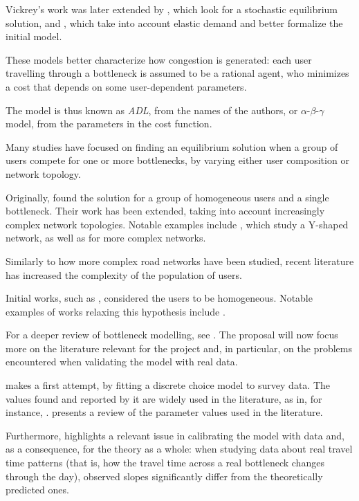 \documentclass{article}
\begin{document}
Vickrey's work was later extended by \textcite{de1983stochastic},
which look for a stochastic equilibrium solution,
and \textcite{d0907f84-e14a-3d98-ad20-759f41491d6e},
which take into account elastic demand and better formalize the initial model.

These models better characterize how congestion is generated:
each user travelling through a bottleneck is assumed to be a rational agent, 
who minimizes a cost that depends on some user-dependent parameters.

The model is thus known as \textit{ADL}, from the names of the authors,
or \(\alpha\)-\(\beta\)-\(\gamma\) model, from the parameters in the cost function.

Many studies have focused on finding an equilibrium solution when a group of users compete for one or more bottlenecks,
by varying either user composition or network topology.

Originally, \textcite{de1983stochastic} found the solution for a group of homogeneous users and a single bottleneck.
Their work has been extended, taking into account increasingly complex network topologies.
Notable examples include \textcite{doi:10.1287/trsc.24.3.217, doi:10.1287/trsc.27.2.148},
which study a Y-shaped network,
as well as \textcite{AKAMATSU2015808} for more complex networks.

Similarly to how more complex road networks have been studied,
recent literature has increased the complexity of the population of users.

Initial works, such as \textcite{Vickrey1969}, considered the users to be homogeneous.
Notable examples of works relaxing this hypothesis include \textcite{arnott1988schedule, amirgholy2017analytical}.

For a deeper review of bottleneck modelling, see \textcite{LI2020311}.
The proposal will now focus more on the literature relevant for the project and,
in particular, on the problems encountered when validating the model with real data.

\textcite{54d203ee-4bf8-3234-9286-56e4c8b7f5bd} makes a first attempt,
by fitting a discrete choice model to survey data.
The values found and reported by it are widely used in the literature,
as in, for instance, \textcite{d0907f84-e14a-3d98-ad20-759f41491d6e}.
\textcite{https://doi.org/10.1111/iere.12692} presents a review of the parameter values used in the literature.

Furthermore, \textcite{https://doi.org/10.1111/iere.12692} highlights a relevant issue in calibrating the model with data and,
as a consequence, for the theory as a whole:
when studying data about real travel time patterns (that is, how the travel time across a real bottleneck changes through the day),
observed slopes significantly differ from the theoretically predicted ones.
\end{document}

